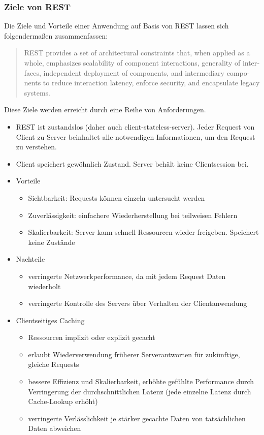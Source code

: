 \subsubsection{Ziele von REST}
Die Ziele und Vorteile einer Anwendung auf Basis von REST lassen sich folgendermaßen zusammenfassen:
\foreignblockcquote{english}[105]{REST}{REST provides a set of architectural constraints that, when applied as a whole, emphasizes scalability of component interactions, generality of interfaces, independent deployment of components, and intermediary components to reduce interaction latency, enforce security, and encapsulate  legacy  systems.}
Diese Ziele werden erreicht durch eine Reihe von Anforderungen.
\begin{itemize}
  \item REST ist zustandslos (daher auch client-stateless-server). Jeder Request von Client zu Server beinhaltet alle notwendigen Informationen, um den Request zu verstehen.
  \item Client speichert gewöhnlich Zustand. Server behält keine Clientsession bei.
  \item Vorteile
  \begin{itemize}
    \item Sichtbarkeit: Requests können einzeln untersucht werden
    \item Zuverlässigkeit: einfachere Wiederherstellung bei teilweisen Fehlern
    \item Skalierbarkeit: Server kann schnell Ressourcen wieder freigeben. Speichert keine Zustände
  \end{itemize}
  \item Nachteile
  \begin{itemize}
    \item verringerte Netzwerkperformance, da mit jedem Request Daten wiederholt
    \item verringerte Kontrolle des Servers über Verhalten der Clientanwendung
  \end{itemize}
  \item Clientseitiges Caching
  \begin{itemize}
    \item Ressourcen implizit oder explizit gecacht
    \item erlaubt Wiederverwendung früherer Serverantworten für zukünftige, gleiche Requests
    \item bessere Effizienz und Skalierbarkeit, erhöhte gefühlte Performance durch Verringerung der durchschnittlichen Latenz (jede einzelne Latenz durch Cache-Lookup erhöht)
    \item verringerte Verlässlichkeit je stärker gecachte Daten von tatsächlichen Daten abweichen
  \end{itemize}
\end{itemize}
